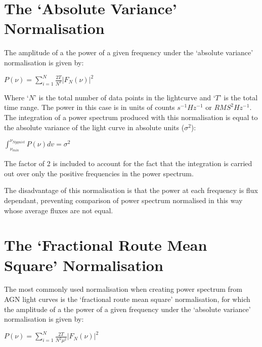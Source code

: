 \documentclass[letters,useAMS,usenatbib]{samnote}
\begin{document}
\section{The `Absolute Variance' Normalisation}

The amplitude of a the power of a given frequency under the `absolute variance' normalisation is given by:

\vspace{\baselineskip}
\setlength\parindent{20pt}
$P(\nu)=\sum\limits_{i=1}^N \displaystyle\frac{2T}{N^2} |F_N(\nu)|^2$
\vspace{\baselineskip}

\setlength\parindent{0pt}
Where `$N$' is the total number of data points in the lightcurve and `$T$' is the total time range. The power in this case is in units of counts $s^{-1} Hz^{-1}$ or $RMS^2 Hz^{-1}$. The integration of a power spectrum produced with this normalisation is equal to the absolute variance of the light curve in absolute units ($\sigma^2$):

\vspace{\baselineskip}
\setlength\parindent{20pt}
$\displaystyle\int_{\nu_{min}}^{\nu_{Nyquist}} P(\nu) dv =\sigma^2 $
\vspace{\baselineskip}

\setlength\parindent{0pt}
The factor of 2 is included to account for the fact that the integration is carried out over only the positive frequencies in the power spectrum. 

\setlength\parindent{20pt}
The disadvantage of this normalisation is that the power at each frequency is flux dependant, preventing comparison of power spectrum normalised in this way whose average fluxes are not equal.

\section{The `Fractional Route Mean Square' Normalisation}

The most commonly used normalisation when creating power spectrum from AGN light curves is the `fractional route mean square' normalisation, for which the amplitude of a the power of a given frequency under the `absolute variance' normalisation is given by:

\vspace{\baselineskip}
\setlength\parindent{20pt}
$P(\nu)=\sum\limits_{i=1}^N \displaystyle\frac{2T}{N^2 \mu^2} |F_N(\nu)|^2$
\vspace{\baselineskip}
\end{document}
